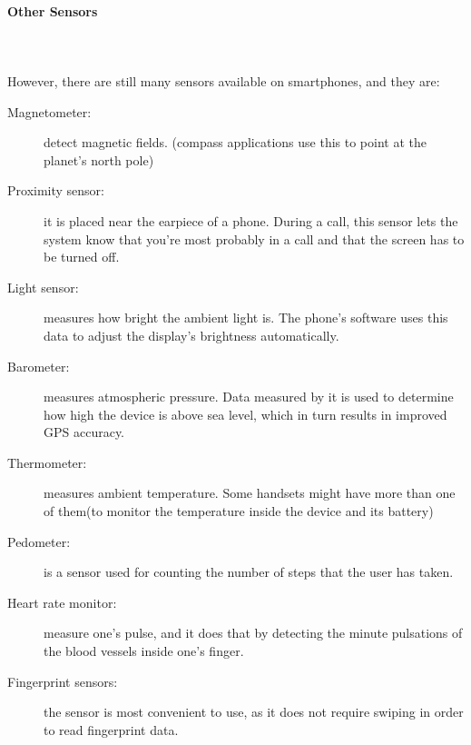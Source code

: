 \documentclass[tesi]{subfiles}
\begin{document}
\paragraph{{\Large Other Sensors}}\leavevmode\\\\
However, there are still many sensors available on smartphones, and they are:
\begin{description}
\item[Magnetometer:] detect magnetic fields. (compass applications use this to point at the planet's north pole)
\item[Proximity sensor:] it is placed near the earpiece of a phone. During a call, this sensor lets the system know that you're most probably in a call and that the screen has to be turned off.
\item[Light sensor:] measures how bright the ambient light is. The phone's software uses this data to adjust the display's brightness automatically.
\item[Barometer:] measures atmospheric pressure. Data measured by it is used to determine how high the device is above sea level, which in turn results in improved GPS accuracy. 
\item[Thermometer:] measures ambient temperature. Some handsets might have more than one of them(to monitor the temperature inside the device and its battery)
\item[Pedometer:] is a sensor used for counting the number of steps that the user has taken.
\item[Heart rate monitor:] measure one's pulse, and it does that by detecting the minute pulsations of the blood vessels inside one's finger.
\item[Fingerprint sensors:] the sensor is most convenient to use, as it does not require swiping in order to read fingerprint data.
\end{description}
\clearpage
\end{document}
